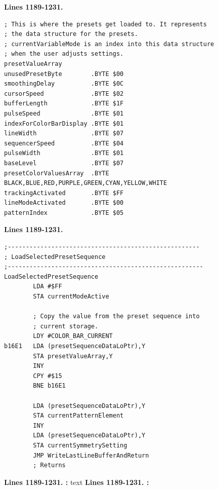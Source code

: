 \clearpage
\textbf{Lines 1189-1231. } 
\begin{lstlisting}
; This is where the presets get loaded to. It represents
; the data structure for the presets.
; currentVariableMode is an index into this data structure
; when the user adjusts settings.
presetValueArray
unusedPresetByte        .BYTE $00
smoothingDelay          .BYTE $0C
cursorSpeed             .BYTE $02
bufferLength            .BYTE $1F
pulseSpeed              .BYTE $01
indexForColorBarDisplay .BYTE $01
lineWidth               .BYTE $07
sequencerSpeed          .BYTE $04
pulseWidth              .BYTE $01
baseLevel               .BYTE $07
presetColorValuesArray  .BYTE BLACK,BLUE,RED,PURPLE,GREEN,CYAN,YELLOW,WHITE
trackingActivated       .BYTE $FF
lineModeActivated       .BYTE $00
patternIndex            .BYTE $05
\end{lstlisting}
\textbf{Lines 1189-1231. } 
\begin{lstlisting}
;-----------------------------------------------------
; LoadSelectedPresetSequence
;------------------------------------------------------
LoadSelectedPresetSequence    
        LDA #$FF
        STA currentModeActive

        ; Copy the value from the preset sequence into 
        ; current storage.
        LDY #COLOR_BAR_CURRENT
b16E1   LDA (presetSequenceDataLoPtr),Y
        STA presetValueArray,Y
        INY 
        CPY #$15
        BNE b16E1

        LDA (presetSequenceDataLoPtr),Y
        STA currentPatternElement
        INY 
        LDA (presetSequenceDataLoPtr),Y
        STA currentSymmetrySetting
        JMP WriteLastLineBufferAndReturn
        ; Returns
\end{lstlisting}
\clearpage

\textbf{Lines 1189-1231. :} 
text
\textbf{Lines 1189-1231. :} 
\clearpage

